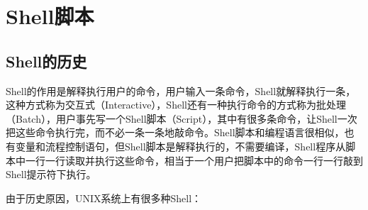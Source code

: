 

\chapter{Shell脚本}
%





\section{Shell的历史}
%
Shell的作用是解释执行用户的命令，用户输入一条命令，Shell就解释执行一条，这种方式称为交互式（Interactive），Shell还有一种执行命令的方式称为批处理（Batch），用户事先写一个Shell脚本（Script），其中有很多条命令，让Shell一次把这些命令执行完，而不必一条一条地敲命令。Shell脚本和编程语言很相似，也有变量和流程控制语句，但Shell脚本是解释执行的，不需要编译，Shell程序从脚本中一行一行读取并执行这些命令，相当于一个用户把脚本中的命令一行一行敲到Shell提示符下执行。



由于历史原因，UNIX系统上有很多种Shell：


